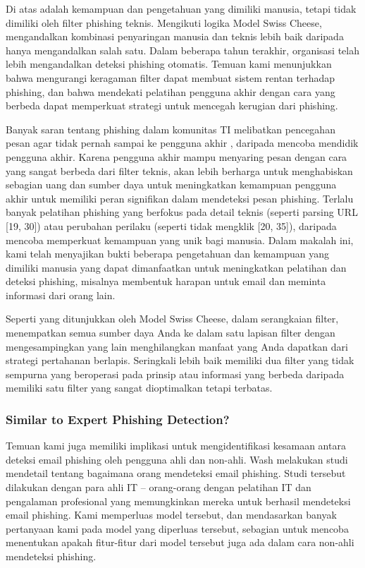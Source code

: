 \documentclass[lettersize,journal]{IEEEtran}
\begin{document}
Di atas adalah kemampuan dan pengetahuan yang dimiliki manusia, tetapi tidak
dimiliki oleh filter phishing teknis. Mengikuti logika Model Swiss Cheese,
mengandalkan kombinasi penyaringan manusia dan teknis lebih baik daripada hanya
mengandalkan salah satu. Dalam beberapa tahun terakhir, organisasi telah lebih
mengandalkan deteksi phishing otomatis. Temuan kami menunjukkan bahwa
mengurangi keragaman filter dapat membuat sistem rentan terhadap phishing, dan
bahwa mendekati pelatihan pengguna akhir dengan cara yang berbeda dapat
memperkuat strategi untuk mencegah kerugian dari phishing.

Banyak saran tentang phishing dalam komunitas TI melibatkan pencegahan pesan
agar tidak pernah sampai ke pengguna akhir \cite{satuempat}, daripada mencoba
mendidik pengguna akhir. Karena pengguna akhir mampu menyaring pesan dengan
cara yang sangat berbeda dari filter teknis, akan lebih berharga untuk
menghabiskan sebagian uang dan sumber daya untuk meningkatkan kemampuan
pengguna akhir untuk memiliki peran signifikan dalam mendeteksi pesan phishing.
Terlalu banyak pelatihan phishing yang berfokus pada detail teknis (seperti
parsing URL [19, 30]) atau perubahan perilaku (seperti tidak mengklik [20,
    35]), daripada mencoba memperkuat kemampuan yang unik bagi manusia. Dalam
makalah ini, kami telah menyajikan bukti beberapa pengetahuan dan kemampuan
yang dimiliki manusia yang dapat dimanfaatkan untuk meningkatkan pelatihan dan
deteksi phishing, misalnya membentuk harapan untuk email dan meminta informasi
dari orang lain.

Seperti yang ditunjukkan oleh Model Swiss Cheese, dalam serangkaian filter,
menempatkan semua sumber daya Anda ke dalam satu lapisan filter dengan
mengesampingkan yang lain menghilangkan manfaat yang Anda dapatkan dari
strategi pertahanan berlapis. Seringkali lebih baik memiliki dua filter yang
tidak sempurna yang beroperasi pada prinsip atau informasi yang berbeda
daripada memiliki satu filter yang sangat dioptimalkan tetapi terbatas.

\subsubsection{Similar to Expert Phishing Detection?}

Temuan kami juga memiliki implikasi untuk mengidentifikasi kesamaan antara
deteksi email phishing oleh pengguna ahli dan non-ahli. Wash \cite{tigaempat}
melakukan studi mendetail tentang bagaimana orang mendeteksi email phishing.
Studi tersebut dilakukan dengan para ahli IT – orang-orang dengan pelatihan IT
dan pengalaman profesional yang memungkinkan mereka untuk berhasil mendeteksi
email phishing. Kami memperluas model tersebut, dan mendasarkan banyak
pertanyaan kami pada model yang diperluas tersebut, sebagian untuk mencoba
menentukan apakah fitur-fitur dari model tersebut juga ada dalam cara non-ahli
mendeteksi phishing.
\end{document}
